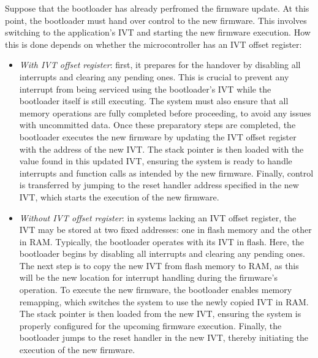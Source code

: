 Suppose that the bootloader has already perfromed the firmware update. 
At this point, the bootloader must hand over control to the new firmware. 
This involves switching to the application's IVT and starting the new firmware execution. 
How this is done depends on whether the microcontroller has an IVT offset register: 
\begin{itemize}
    \item \textit{With IVT offset register}: first, it prepares for the handover by disabling all interrupts and clearing any pending ones. 
        This is crucial to prevent any interrupt from being serviced using the bootloader's IVT while the bootloader itself is still executing. 
        The system must also ensure that all memory operations are fully completed before proceeding, to avoid any issues with uncommitted data.
        Once these preparatory steps are completed, the bootloader executes the new firmware by updating the IVT offset register with the address of the new IVT. 
        The stack pointer is then loaded with the value found in this updated IVT, ensuring the system is ready to handle interrupts and function calls as intended by the new firmware. 
        Finally, control is transferred by jumping to the reset handler address specified in the new IVT, which starts the execution of the new firmware.
    \item \textit{Without IVT offset register}: in systems lacking an IVT offset register, the IVT may be stored at two fixed addresses: one in flash memory and the other in RAM. 
        Typically, the bootloader operates with its IVT in flash. 
        Here, the bootloader begins by disabling all interrupts and clearing any pending ones.
        The next step is to copy the new IVT from flash memory to RAM, as this will be the new location for interrupt handling during the firmware's operation.
        To execute the new firmware, the bootloader enables memory remapping, which switches the system to use the newly copied IVT in RAM. 
        The stack pointer is then loaded from the new IVT, ensuring the system is properly configured for the upcoming firmware execution. 
        Finally, the bootloader jumps to the reset handler in the new IVT, thereby initiating the execution of the new firmware.
\end{itemize}
